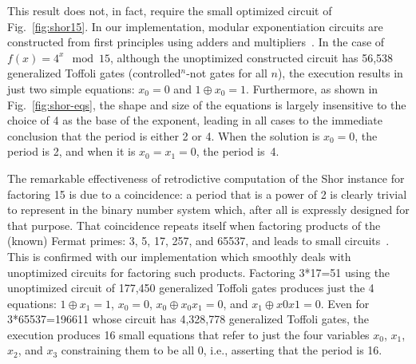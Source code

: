 \documentclass[sigplan,review]{acmart}
\begin{document}
This result does not, in fact, require the small optimized circuit of
Fig.~\ref{fig:shor15}. In our implementation, modular exponentiation
circuits are constructed from first principles using adders and
multipliers~\cite{PhysRevA.54.147}. In the case of $f(x) = 4^x
\mod{15}$, although the unoptimized constructed circuit has 56,538
generalized Toffoli gates (controlled$^{n}$-not gates for all $n$),
the execution results in just two simple equations: $x_0 = 0$ and $1
\oplus x_0 = 1$. Furthermore, as shown in Fig.~\ref{fig:shor-eqs}, the
shape and size of the equations is largely insensitive to the choice
of 4 as the base of the exponent, leading in all cases to the
immediate conclusion that the period is either 2 or 4. When the
solution is $x_0=0$, the period is 2, and when it is $x_0=x_1=0$, the
period is~4.

The remarkable effectiveness of retrodictive computation of the Shor
instance for factoring 15 is due to a coincidence: a period that is a
power of 2 is clearly trivial to represent in the binary number system
which, after all is expressly designed for that purpose. That
coincidence repeats itself when factoring products of the (known)
Fermat primes: 3, 5, 17, 257, and 65537, and leads to small
circuits~\cite{shorFermat}. This is confirmed with our implementation
which smoothly deals with unoptimized circuits for factoring such
products. Factoring 3*17=51 using the unoptimized circuit of 177,450
generalized Toffoli gates produces just the 4 equations: $1 \oplus x_1
= 1$, $x_0 = 0$, $x_0 \oplus x_0x_1 = 0$, and $x_1 \oplus x0x1 =
0$. Even for 3*65537=196611 whose circuit has 4,328,778 generalized
Toffoli gates, the execution produces 16 small equations that refer to
just the four variables $x_0$, $x_1$, $x_2$, and $x_3$ constraining
them to be all 0, i.e., asserting that the period is 16.
\end{document}
